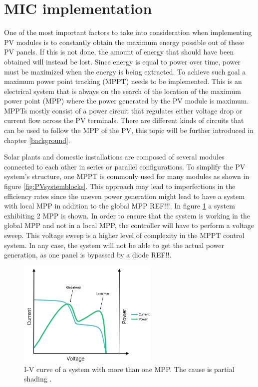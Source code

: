 
\section{MIC implementation}
One of the most important factors to take into consideration when implementing PV modules is to constantly obtain the maximum energy possible out of these PV panels. If this is not done, the amount of energy that should have been obtained will instead be lost. Since energy is equal to power over time, power must be maximized when the energy is being extracted. To achieve such goal a maximum power point tracking (MPPT) needs to be implemented. This is an electrical system that is always on the search of the location of the maximum power point (MPP) where the power generated by the PV module is maximum. MPPTs mostly consist of a power circuit that regulates either voltage drop or current flow across the PV terminals. There are different kinds of circuits that can be used to follow the MPP of the PV, this topic will be further introduced in chapter \ref{background}.

Solar plants and domestic installations are composed of several modules connected to each other in series or parallel configurations. To simplify the PV system's structure, one MPPT is commonly used for many modules as shown in figure \ref{fig:PVsystemblocks}. This approach may lead to imperfections in the efficiency rates since the uneven power generation might lead to have a system with local MPP in addition to the global MPP REF!!!. In figure \ref{multiple_local_MPP} a system exhibiting 2 MPP is shown. In order to ensure that the system is working in the global MPP and not in a local MPP, the controller will have to perform a voltage sweep. This voltage sweep is a higher level of complexity in the MPPT control system. In any case, the system will not be able to get the actual power generation, as one panel is bypassed by a diode REF!!.

\begin{figure}[htbp]
	\begin{center}
		\includegraphics[width=0.6\textwidth]{../Pictures/local_MPP}
		\caption{I-V curve of a system with more than one MPP. The cause is partial shading \cite{local_mpp}.}
		\label{multiple_local_MPP}
	\end{center}	
\end{figure}

